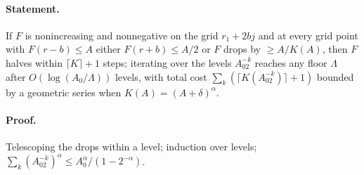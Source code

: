 \paragraph{Statement.} If $F$ is nonincreasing and nonnegative on the grid $r_1+2bj$ and at every grid point with $F(r-b)\leq A$ either $F(r+b)\leq A/2$ or $F$ drops by $\geq A/K(A)$, then $F$ halves within $\lceil K\rceil+1$ steps; iterating over the levels $A_02^{-k}$ reaches any floor $\Lambda$ after $O(\log(A_0/\Lambda))$ levels, with total cost $\sum_k(\lceil K(A_02^{-k})\rceil+1)$ bounded by a geometric series when $K(A)=(A+\delta)^\alpha$.
\paragraph{Proof.} Telescoping the drops within a level; induction over levels; $\sum_k(A_02^{-k})^\alpha\leq A_0^\alpha/(1-2^{-\alpha})$.
